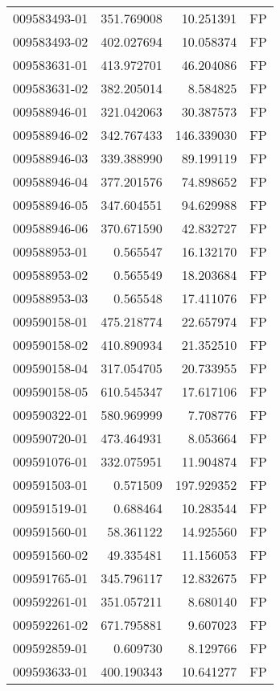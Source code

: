 \begin{tabular}{lrrl}
009583493-01 &  351.769008 &    10.251391 &   FP \\
009583493-02 &  402.027694 &    10.058374 &   FP \\
009583631-01 &  413.972701 &    46.204086 &   FP \\
009583631-02 &  382.205014 &     8.584825 &   FP \\
009588946-01 &  321.042063 &    30.387573 &   FP \\
009588946-02 &  342.767433 &   146.339030 &   FP \\
009588946-03 &  339.388990 &    89.199119 &   FP \\
009588946-04 &  377.201576 &    74.898652 &   FP \\
009588946-05 &  347.604551 &    94.629988 &   FP \\
009588946-06 &  370.671590 &    42.832727 &   FP \\
009588953-01 &    0.565547 &    16.132170 &   FP \\
009588953-02 &    0.565549 &    18.203684 &   FP \\
009588953-03 &    0.565548 &    17.411076 &   FP \\
009590158-01 &  475.218774 &    22.657974 &   FP \\
009590158-02 &  410.890934 &    21.352510 &   FP \\
009590158-04 &  317.054705 &    20.733955 &   FP \\
009590158-05 &  610.545347 &    17.617106 &   FP \\
009590322-01 &  580.969999 &     7.708776 &   FP \\
009590720-01 &  473.464931 &     8.053664 &   FP \\
009591076-01 &  332.075951 &    11.904874 &   FP \\
009591503-01 &    0.571509 &   197.929352 &   FP \\
009591519-01 &    0.688464 &    10.283544 &   FP \\
009591560-01 &   58.361122 &    14.925560 &   FP \\
009591560-02 &   49.335481 &    11.156053 &   FP \\
009591765-01 &  345.796117 &    12.832675 &   FP \\
009592261-01 &  351.057211 &     8.680140 &   FP \\
009592261-02 &  671.795881 &     9.607023 &   FP \\
009592859-01 &    0.609730 &     8.129766 &   FP \\
009593633-01 &  400.190343 &    10.641277 &   FP \\

\end{tabular}
